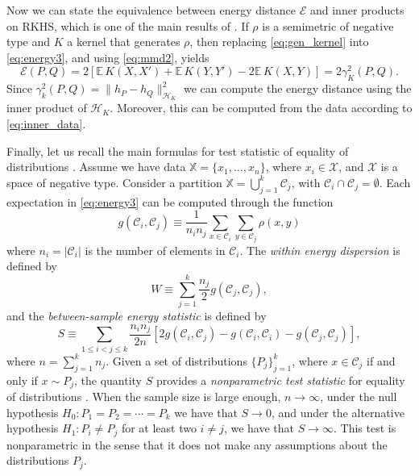 \documentclass[aps,preprint,nofootinbib,floatfix]{revtex4-1}
\newcommand\Energy{\mathcal{E}}
\newcommand\E{\mathbb{E}}
\newcommand\kk{K}
\newcommand\kkk{h}
\newcommand\Hk{{\mathcal{H}}_{\kk}}
\newcommand\C{{\mathcal{C}}}
\begin{document}
Now we can state the equivalence between energy distance $\Energy$ and
inner products on RKHS, which is one of the main results of
\cite{Sejdinovic2013}. If $\rho$ is a semimetric
of negative type and $\kk$ a kernel that generates $\rho$, then
replacing \eqref{eq:gen_kernel} into
\eqref{eq:energy3}, and using \eqref{eq:mmd2}, yields
\begin{equation} \label{eq:Erho}
\Energy(P, Q) = 
2 \left[ \E \, \kk(X, X') + \E \, \kk(Y, Y') - 2\E \, \kk(X, Y)\right] 
= 2 \gamma_\kk^2(P,Q) .
\end{equation}
Since $\gamma_k^2(P, Q) = \| \kkk_P - \kkk_Q \|^2_{\Hk}$ we
can compute the energy distance using the inner product of $\Hk$. Moreover,
this can be computed from the data according to \eqref{eq:inner_data}.

Finally, let us recall the main formulas for test statistic
of equality of distributions \cite{Szkely2013}. 
Assume we have data $\mathbb{X} = \{ x_1,\dotsc, x_n \}$, where
$x_i \in \mathcal{X}$, and $\mathcal{X}$ is a space of negative type.
Consider a partition $\mathbb{X} = \bigcup_{j=1}^k \C_j$, with
$\C_i \cap \C_j = \emptyset$.
Each expectation in 
\eqref{eq:energy3}
can be computed 
through the function
\begin{equation}
\label{eq:g_def}
g (\C_i, \C_j) \equiv 
\dfrac{1}{n_i n_j}
\sum_{x \in \C_i} 
\sum_{y \in \C_j} \rho(x, y)
\end{equation}
where $n_i = |\C_i|$ is the number of elements in 
$\C_i$. 
The \emph{within energy dispersion} is defined by
\begin{equation}
\label{eq:within}
W \equiv
\sum_{j=1}^{k} \dfrac{n_j}{2} g(\C_j, \C_j),
\end{equation}
and the \emph{between-sample energy statistic} is defined by
\begin{equation}
\label{eq:between}
S \equiv
\sum_{1 \le  i < j \le k } \dfrac{n_i n_{j}}{2 n} \left[
2 g(\C_i, \C_j) - 
g(\C_i, \C_i) - 
g(\C_j, \C_j)
\right],
\end{equation}
where $n = \sum_{j=1}^k n_j$.
Given a set of distributions
$\{ P_j\}_{j=1}^k$, where $x \in \C_j$ if and only if $x \sim P_j$, 
the quantity $S$ provides
a \emph{nonparametric test statistic} for equality of distributions
\cite{Szkely2013}.
When the sample size is large enough, $n\to \infty$,
under the null hypothesis $H_0: P_1=P_2=\dotsm=P_k$ we have that
$S\to 0$, 
and under
the alternative hypothesis $H_1: P_i \ne P_j$ for at least two $i\ne j$, 
we have that $S \to \infty$.
This test is nonparametric in the sense that it does not make any assumptions
about the distributions $P_j$.
\end{document}
